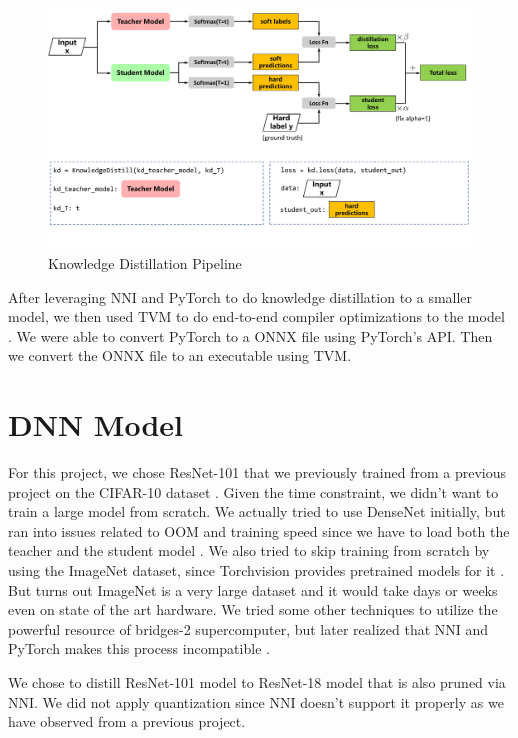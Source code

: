 \documentclass{article}
\begin{document}
\begin{figure}
    \centerline{\includegraphics[width=7in]{../proj4/figures/distill.png}}
    \caption{Knowledge Distillation Pipeline \cite{nni}}
    \label{fig:kd-pipe}
\end{figure}

After leveraging NNI and PyTorch to do knowledge distillation to a smaller model, we then used TVM to do end-to-end compiler optimizations to the model \cite{tvm}.
We were able to convert PyTorch to a ONNX file using PyTorch's API. Then we convert the ONNX file to an executable using TVM.

\section{DNN Model}
For this project, we chose ResNet-101 that we previously trained from a previous project on the CIFAR-10 dataset \cite{resnet, cifar10}. Given the time constraint, we didn't want to train a large model from scratch. We actually tried to use DenseNet initially, but ran into issues related to OOM and training speed since we have to load both the teacher and the student model \cite{densenet}. We also tried to skip training from scratch by using the ImageNet dataset, since Torchvision provides pretrained models for it \cite{imagenet, torchvision}. But turns out ImageNet is a very large dataset and it would take days or weeks even on state of the art hardware. We tried some other techniques to utilize the powerful resource of bridges-2 supercomputer, but later realized that NNI and PyTorch makes this process incompatible \cite{bridges-2}.

We chose to distill ResNet-101 model to ResNet-18 model that is also pruned via NNI. We did not apply quantization since NNI doesn't support it properly as we have observed from a previous project. 
\end{document}
